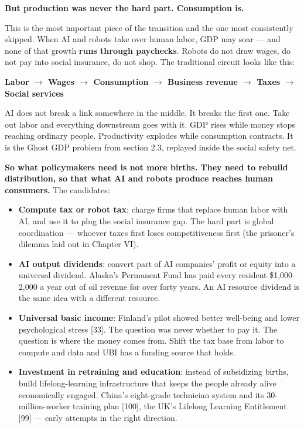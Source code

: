 \documentclass[11pt,a4paper]{article}
\begin{document}
\textbf{But production was never the hard part. Consumption is.}

This is the most important piece of the transition and the one most consistently skipped. When AI and robots take over human labor, GDP may soar --- and none of that growth \textbf{runs through paychecks}. Robots do not draw wages, do not pay into social insurance, do not shop. The traditional circuit looks like this:

\textbf{Labor $\to$ Wages $\to$ Consumption $\to$ Business revenue $\to$ Taxes $\to$ Social services}

AI does not break a link somewhere in the middle. It breaks the first one. Take out labor and everything downstream goes with it. GDP rises while money stops reaching ordinary people. Productivity explodes while consumption contracts. It is the Ghost GDP problem from section 2.3, replayed inside the social safety net.

\textbf{So what policymakers need is not more births. They need to rebuild distribution, so that what AI and robots produce reaches human consumers.} The candidates:

\begin{itemize}
  \item \textbf{Compute tax or robot tax}: charge firms that replace human labor with AI, and use it to plug the social insurance gap. The hard part is global coordination --- whoever taxes first loses competitiveness first (the prisoner's dilemma laid out in Chapter VI).
  \item \textbf{AI output dividends}: convert part of AI companies' profit or equity into a universal dividend. Alaska's Permanent Fund has paid every resident \$1,000--2,000 a year out of oil revenue for over forty years. An AI resource dividend is the same idea with a different resource.
  \item \textbf{Universal basic income}: Finland's pilot showed better well-being and lower psychological stress [33]. The question was never whether to pay it. The question is where the money comes from. Shift the tax base from labor to compute and data and UBI has a funding source that holds.
  \item \textbf{Investment in retraining and education}: instead of subsidizing births, build lifelong-learning infrastructure that keeps the people already alive economically engaged. China's eight-grade technician system and its 30-million-worker training plan [100], the UK's Lifelong Learning Entitlement [99] --- early attempts in the right direction.
\end{itemize}
\end{document}
